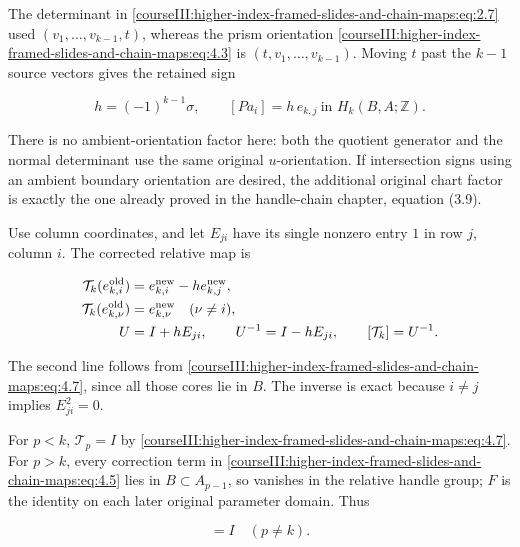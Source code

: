 The determinant in \eqref{courseIII:higher-index-framed-slides-and-chain-maps:eq:2.7} used \((v_1,\ldots,v_{k-1},t)\), whereas the prism orientation \eqref{courseIII:higher-index-framed-slides-and-chain-maps:eq:4.3} is \((t,v_1,\ldots,v_{k-1})\). Moving \(t\) past the \(k-1\) source vectors gives the retained sign

\begin{equation}
h=(-1)^{k-1}\sigma,\qquad
 [P a_i]=h\,e_{k,j}\ \text{in }H_k(B,A;\mathbb Z).
 \label{courseIII:higher-index-framed-slides-and-chain-maps:eq:5.3}
\end{equation}

There is no ambient-orientation factor here: both the quotient generator and the normal determinant use the same original \(u\)-orientation. If intersection signs using an ambient boundary orientation are desired, the additional original chart factor is exactly the one already proved in the handle-chain chapter, equation (3.9).

Use column coordinates, and let \(E_{ji}\) have its single nonzero entry \(1\) in row \(j\), column \(i\). The corrected relative map is

\begin{equation}
\begin{aligned}
 \mathcal T_k(e_{k,i}^{\rm old})
    &=e_{k,i}^{\rm new}-h e_{k,j}^{\rm new},\\
 \mathcal T_k(e_{k,\nu}^{\rm old})
    &=e_{k,\nu}^{\rm new}\quad(\nu\ne i),\\
 U&=I+hE_{ji},\qquad
 U^{-1}=I-hE_{ji},\qquad [\mathcal T_k]=U^{-1}.
 \end{aligned}
 \label{courseIII:higher-index-framed-slides-and-chain-maps:eq:5.4}
\end{equation}

The second line follows from \eqref{courseIII:higher-index-framed-slides-and-chain-maps:eq:4.7}, since all those cores lie in \(B\). The inverse is exact because \(i\ne j\) implies \(E_{ji}^2=0\).

For \(p<k\), \(\mathcal T_p=I\) by \eqref{courseIII:higher-index-framed-slides-and-chain-maps:eq:4.7}. For \(p>k\), every correction term in \eqref{courseIII:higher-index-framed-slides-and-chain-maps:eq:4.5} lies in \(B\subset A_{p-1}\), so vanishes in the relative handle group; \(F\) is the identity on each later original parameter domain. Thus

\begin{equation}
[\mathcal T_p]=I\quad(p\ne k).
 \label{courseIII:higher-index-framed-slides-and-chain-maps:eq:5.5}
\end{equation}

